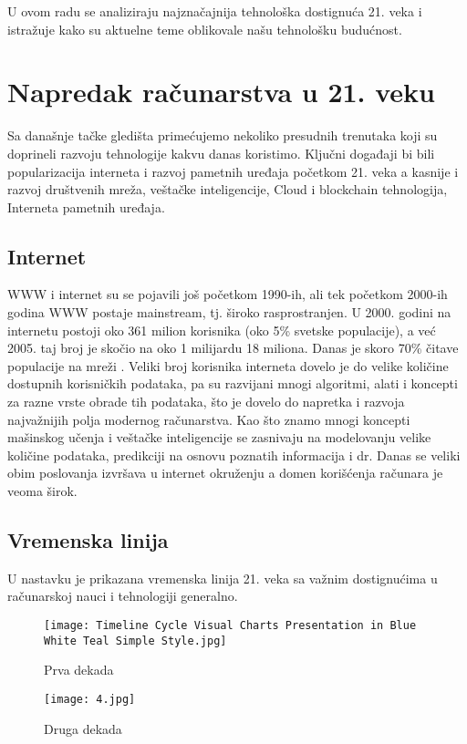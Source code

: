 \documentclass[a4paper]{article}
\begin{document}
{U ovom radu se analiziraju najznačajnija tehnološka dostignuća 21. veka i istražuje kako su aktuelne teme oblikovale našu tehnološku budućnost.

\setlength{\parskip}{1em}

\section{Napredak računarstva u 21. veku}
\label{sec:rac_21. vek}
Sa današnje tačke gledišta primećujemo nekoliko presudnih trenutaka koji su doprineli razvoju tehnologije kakvu danas koristimo. Ključni događaji bi bili popularizacija interneta i razvoj pametnih uređaja početkom 21. veka a kasnije i razvoj društvenih mreža, veštačke inteligencije, Cloud i blockchain tehnologija, Interneta pametnih uređaja. 
\subsection{Internet}
WWW i internet su se pojavili još početkom 1990-ih, ali tek početkom 2000-ih godina WWW postaje mainstream, tj. široko rasprostranjen. U 2000. godini na internetu postoji oko 361 milion korisnika (oko 5\% svetske populacije), a već 2005. taj broj je skočio na oko 1 milijardu 18 miliona. Danas je skoro 70\% čitave populacije na mreži \cite{worldstats}. Veliki broj korisnika interneta dovelo je do velike količine dostupnih korisničkih podataka, pa su razvijani mnogi algoritmi, alati i koncepti za razne vrste obrade tih podataka, što je dovelo do napretka i razvoja najvažnijih polja modernog računarstva. Kao što znamo mnogi koncepti mašinskog učenja i veštačke inteligencije se zasnivaju na modelovanju velike količine podataka, predikciji na osnovu poznatih informacija i dr.
Danas se veliki obim poslovanja izvršava u internet okruženju a domen korišćenja računara je veoma širok.
\subsection{Vremenska linija}

U nastavku je prikazana vremenska linija 21. veka sa važnim dostignućima u računarskoj nauci i tehnologiji generalno. 


\begin{figure}[h!]
\begin{center}
\texttt{[image: Timeline Cycle Visual Charts Presentation in Blue White Teal Simple Style.jpg]}
\end{center}
\caption{Prva dekada}
\label{fig:kvant}
\end{figure}
\begin{figure}[h!]
\begin{center}
\texttt{[image: 4.jpg]}
\end{center}
\caption{Druga dekada}
\label{fig:kvant}
\end{figure}


}
\end{document}
